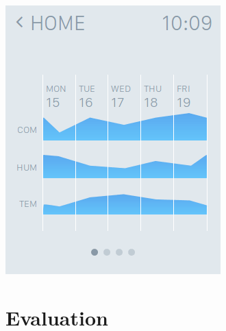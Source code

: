 \documentclass[a4paper,10pt]{article}
\begin{document}
\includegraphics[scale=0.4]{images/history.png}

\section{Evaluation}
\end{document}
